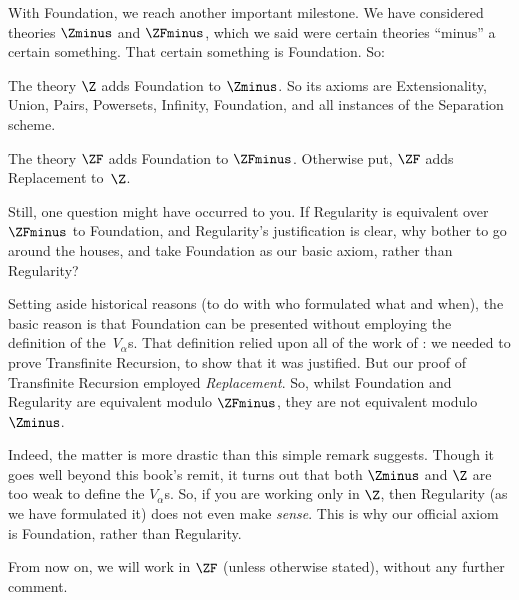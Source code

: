 \documentclass[../../../include/open-logic-section]{subfiles}
\begin{document}

With Foundation, we reach another important milestone. We have
considered theories $\Zminus$ and $\ZFminus$, which we said were
certain theories ``minus'' a certain something. That certain something
is Foundation. So:

\begin{defn}
The theory $\Z$ adds Foundation to $\Zminus$. So its axioms are
Extensionality, Union, Pairs, Powersets, Infinity, Foundation, and all
instances of the Separation scheme.

The theory $\ZF$ adds Foundation to $\ZFminus$. Otherwise put, $\ZF$
adds Replacement to~$\Z$.
\end{defn}

Still, one question might have occurred to you. If Regularity is
equivalent over $\ZFminus$ to Foundation, and Regularity's
justification is clear, why bother to go around the houses, and take
Foundation as our basic axiom, rather than Regularity? 

Setting aside historical reasons (to do with who formulated what and
when), the basic reason is that Foundation can be presented without
employing the definition of the~$V_\alpha$s. That definition relied
upon all of the work of : we
needed to prove Transfinite Recursion, to show that it was justified.
But our proof of Transfinite Recursion employed \emph{Replacement}.
So, whilst Foundation and Regularity are equivalent modulo $\ZFminus$,
they are not equivalent modulo $\Zminus$. 

Indeed, the matter is more drastic than this simple remark suggests.
Though it goes well beyond this book's remit, it turns out that both
$\Zminus$ and $\Z$ are too weak to define the $V_\alpha$s. So, if you
are working only in $\Z$, then Regularity (as we have formulated it)
does not even make \emph{sense}. This is why our official axiom is
Foundation, rather than Regularity. 

From now on, we will work in $\ZF$ (unless otherwise stated), without
any further comment. 
\end{document}
